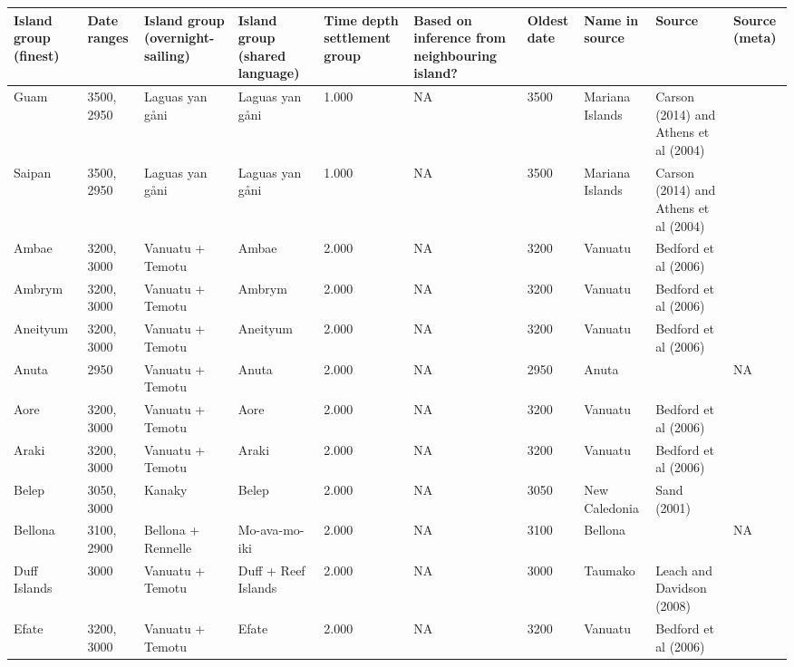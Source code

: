 \begin{longtable}{p{4.5cm}p{2cm}p{2cm}p{2cm}p{4cm}p{4cm}p{4cm}p{4cm}p{4cm}p{4cm}}
  \toprule
Island group (finest) & Date ranges & Island group (overnight-sailing) & Island group (shared language) & Time depth settlement group & Based on inference from neighbouring island? & Oldest date & Name in source & Source & Source (meta) \\ 
  \midrule
Guam & 3500, 2950 & Laguas yan gåni & Laguas yan gåni & 1.000 & NA & 3500 & Mariana Islands & Carson (2014) and Athens et al (2004) & \citet{rieth_cochrane_2018} \\ 
  Saipan & 3500, 2950 & Laguas yan gåni & Laguas yan gåni & 1.000 & NA & 3500 & Mariana Islands & Carson (2014) and Athens et al (2004) & \citet{rieth_cochrane_2018} \\ 
  Ambae & 3200, 3000 & Vanuatu + Temotu & Ambae & 2.000 & NA & 3200 & Vanuatu & Bedford et al (2006) & \citet{rieth_cochrane_2018} \\ 
  Ambrym & 3200, 3000 & Vanuatu + Temotu & Ambrym & 2.000 & NA & 3200 & Vanuatu & Bedford et al (2006) & \citet{rieth_cochrane_2018} \\ 
  Aneityum & 3200, 3000 & Vanuatu + Temotu & Aneityum & 2.000 & NA & 3200 & Vanuatu & Bedford et al (2006) & \citet{rieth_cochrane_2018} \\ 
  Anuta & 2950 & Vanuatu + Temotu & Anuta & 2.000 & NA & 2950 & Anuta & \citet{carson2012recent} & NA \\ 
  Aore & 3200, 3000 & Vanuatu + Temotu & Aore & 2.000 & NA & 3200 & Vanuatu & Bedford et al (2006) & \citet{rieth_cochrane_2018} \\ 
  Araki & 3200, 3000 & Vanuatu + Temotu & Araki & 2.000 & NA & 3200 & Vanuatu & Bedford et al (2006) & \citet{rieth_cochrane_2018} \\ 
  Belep & 3050, 3000 & Kanaky & Belep & 2.000 & NA & 3050 & New Caledonia & Sand (2001) & \citet{rieth_cochrane_2018} \\ 
  Bellona & 3100, 2900 & Bellona + Rennelle & Mo-ava-mo-iki & 2.000 & NA & 3100 & Bellona & \citet{carson2012recent} & NA \\ 
  Duff Islands & 3000 & Vanuatu + Temotu & Duff + Reef Islands & 2.000 & NA & 3000 & Taumako & Leach and Davidson (2008) & \citet{carson2012recent} \\ 
  Efate & 3200, 3000 & Vanuatu + Temotu & Efate & 2.000 & NA & 3200 & Vanuatu & Bedford et al (2006) & \citet{rieth_cochrane_2018} \\ 

\end{longtable}
